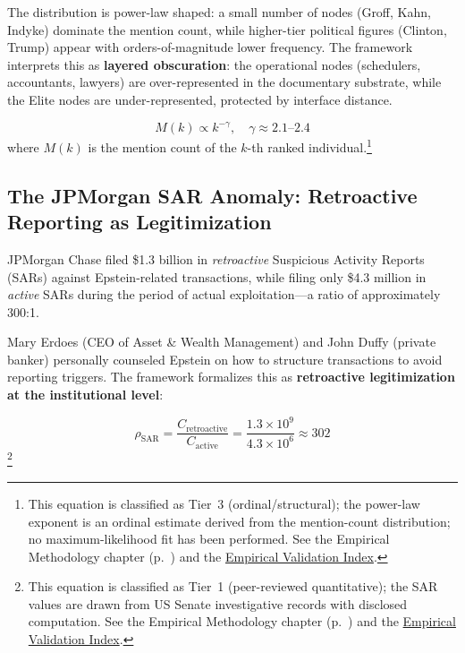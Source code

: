 The distribution is power-law shaped: a small number of nodes (Groff, Kahn, Indyke) dominate the mention count, while higher-tier political figures (Clinton, Trump) appear with orders-of-magnitude lower frequency. The framework interprets this as \textbf{layered obscuration}: the operational nodes (schedulers, accountants, lawyers) are over-represented in the documentary substrate, while the Elite nodes are under-represented, protected by interface distance.

\begin{equation}\label{eq:gp10-mention-power-law}
M(k) \propto k^{-\gamma}, \quad \gamma \approx 2.1 \text{--} 2.4
\end{equation}
where $M(k)$ is the mention count of the $k$-th ranked individual.\footnote{This equation is classified as Tier~3 (ordinal/structural); the power-law exponent is an ordinal estimate derived from the mention-count distribution; no maximum-likelihood fit has been performed. See the Empirical Methodology chapter (p.~\pageref{ch:empirical_methodology}) and the \hyperref[app:empirical_index]{Empirical Validation Index}.}

\subsection{The JPMorgan SAR Anomaly: Retroactive Reporting as Legitimization}

JPMorgan Chase filed \$1.3 billion in \textit{retroactive} Suspicious Activity Reports (SARs) against Epstein-related transactions, while filing only \$4.3 million in \textit{active} SARs during the period of actual exploitation---a ratio of approximately 300:1.

Mary Erdoes (CEO of Asset \& Wealth Management) and John Duffy (private banker) personally counseled Epstein on how to structure transactions to avoid reporting triggers. The framework formalizes this as \textbf{retroactive legitimization at the institutional level}:

\begin{equation}\label{eq:gp11-retroactive-sar}
\rho_{\text{SAR}} = \frac{C_{\text{retroactive}}}{C_{\text{active}}} = \frac{1.3 \times 10^{9}}{4.3 \times 10^{6}} \approx 302
\end{equation}
\footnote{This equation is classified as Tier~1 (peer-reviewed quantitative); the SAR values are drawn from US Senate investigative records with disclosed computation. See the Empirical Methodology chapter (p.~\pageref{ch:empirical_methodology}) and the \hyperref[app:empirical_index]{Empirical Validation Index}.}

